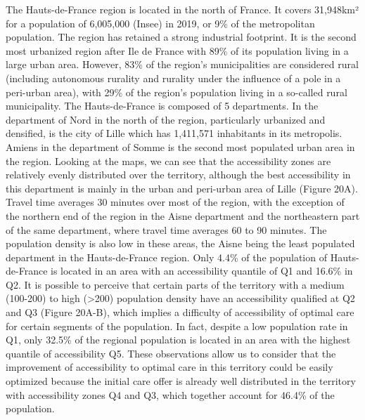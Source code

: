 The Hauts-de-France region is located in the north of France. It covers 31,948km² for a population of 6,005,000 (Insee) in 2019, or 9\% of the metropolitan population. The region has retained a strong industrial footprint. It is the second most urbanized region after Ile de France with 89\% of its population living in a large urban area. However, 83\% of the region's municipalities are considered rural (including autonomous rurality and rurality under the influence of a pole in a peri-urban area), with 29\% of the region's population living in a so-called rural municipality.
The Hauts-de-France is composed of 5 departments. In the department of Nord in the north of the region, particularly urbanized and densified, is the city of Lille which has 1,411,571 inhabitants in its metropolis. Amiens in the department of Somme is the second most populated urban area in the region. Looking at the maps, we can see that the accessibility zones are relatively evenly distributed over the territory, although the best accessibility in this department is mainly in the urban and peri-urban area of Lille (Figure 20A). Travel time averages 30 minutes over most of the region, with the exception of the northern end of the region in the Aisne department and the northeastern part of the same department, where travel time averages 60 to 90 minutes. The population density is also low in these areas, the Aisne being the least populated department in the Hauts-de-France region.
Only 4.4\% of the population of Hauts-de-France is located in an area with an accessibility quantile of Q1 and 16.6\% in Q2. It is possible to perceive that certain parts of the territory with a medium (100-200) to high (>200) population density have an accessibility qualified at Q2 and Q3 (Figure 20A-B), which implies a difficulty of accessibility of optimal care for certain segments of the population. In fact, despite a low population rate in Q1, only 32.5\% of the regional population is located in an area with the highest quantile of accessibility Q5. These observations allow us to consider that the improvement of accessibility to optimal care in this territory could be easily optimized because the initial care offer is already well distributed in the territory with accessibility zones Q4 and Q3, which together account for 46.4\% of the population.

